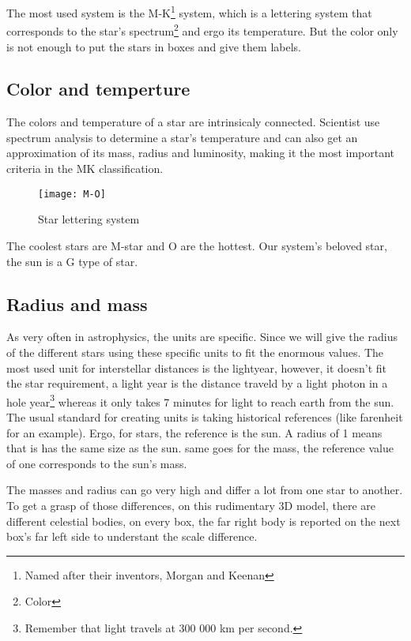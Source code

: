 \documentclass[a4paper, 11pt]{article} %
\begin{document}
The most used system is the M-K\footnote{Named after their inventors, Morgan and Keenan} system, which is a lettering system that corresponds to the star's spectrum\footnote{Color} and ergo its temperature. But the color only is not enough to put the stars in boxes and give them labels.  

\subsection{Color and temperture}

The colors and temperature of a star are intrinsicaly connected. Scientist use spectrum analysis to determine a star's temperature and can also get an approximation of its mass, radius and luminosity, making it the most important criteria in the MK classification.



\begin{figure}[h]
\centering
\texttt{[image: M-O]}
\caption{Star lettering system}
\end{figure}

The coolest stars are M-star and O are the hottest. Our system's beloved star, the sun is a G type of star.


\subsection{Radius and mass}

As very often in astrophysics, the units are specific. Since we will give the radius of the different stars using these specific units to fit the enormous values. The most used unit for interstellar distances is the lightyear, however, it doesn't fit the star requirement, a light year is the distance traveld by a light photon in a hole year\footnote{Remember that light travels at 300 000 km per second.} whereas it only takes 7 minutes for light to reach earth from the sun. The usual standard for creating units is taking historical references (like farenheit for an example). Ergo, for stars, the reference is the sun. A radius of 1 means that is has the same size as the sun. same goes for the mass, the reference value of one corresponds to the sun's mass.

The masses and radius can go very high and differ a lot from one star to another. To get a grasp of those differences, on this rudimentary 3D model, there are different celestial bodies, on every box, the far right body is reported on the next box's far left side to understant the scale difference.
\end{document}
